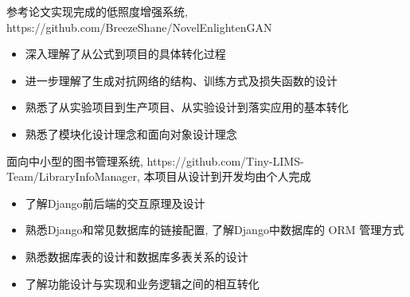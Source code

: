 \documentclass{resume}
\begin{document}
\begin{onehalfspacing}
参考论文实现完成的低照度增强系统, https://github.com/BreezeShane/NovelEnlightenGAN
\begin{itemize}
  \item 深入理解了从公式到项目的具体转化过程
  \item 进一步理解了生成对抗网络的结构、训练方式及损失函数的设计
  \item 熟悉了从实验项目到生产项目、从实验设计到落实应用的基本转化
  \item 熟悉了模块化设计理念和面向对象设计理念
\end{itemize}
\end{onehalfspacing}

\begin{onehalfspacing}
面向中小型的图书管理系统, https://github.com/Tiny-LIMS-Team/LibraryInfoManager, 本项目从设计到开发均由个人完成
\begin{itemize}
  \item 了解Django前后端的交互原理及设计
  \item 熟悉Django和常见数据库的链接配置, 了解Django中数据库的 ORM 管理方式
  \item 熟悉数据库表的设计和数据库多表关系的设计
  \item 了解功能设计与实现和业务逻辑之间的相互转化
\end{itemize}
\end{onehalfspacing}
\end{document}
